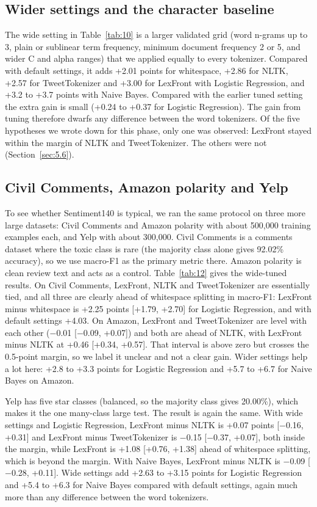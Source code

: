 \documentclass{ieeeaccess}
\begin{document}
\subsection{Wider settings and the character baseline}\label{sec:4.8}
The wide setting in Table~\ref{tab:10} is a larger validated grid (word n-grams up to 3, plain or sublinear term frequency, minimum document frequency 2 or 5, and wider C and alpha ranges) that we applied equally to every tokenizer. Compared with default settings, it adds +2.01 points for whitespace, +2.86 for NLTK, +2.57 for TweetTokenizer and +3.00 for LexFront with Logistic Regression, and +3.2 to +3.7 points with Naive Bayes. Compared with the earlier tuned setting the extra gain is small (+0.24 to +0.37 for Logistic Regression). The gain from tuning therefore dwarfs any difference between the word tokenizers. Of the five hypotheses we wrote down for this phase, only one was observed: LexFront stayed within the margin of NLTK and TweetTokenizer. The others were not (Section~\ref{sec:5.6}).

\subsection{Civil Comments, Amazon polarity and Yelp}\label{sec:4.9}
To see whether Sentiment140 is typical, we ran the same protocol on three more large datasets: Civil Comments and Amazon polarity with about 500,000 training examples each, and Yelp with about 300,000. Civil Comments is a comments dataset where the toxic class is rare (the majority class alone gives 92.02\% accuracy), so we use macro-F1 as the primary metric there. Amazon polarity is clean review text and acts as a control. Table~\ref{tab:12} gives the wide-tuned results. On Civil Comments, LexFront, NLTK and TweetTokenizer are essentially tied, and all three are clearly ahead of whitespace splitting in macro-F1: LexFront minus whitespace is +2.25 points [+1.79, +2.70] for Logistic Regression, and with default settings +4.03. On Amazon, LexFront and TweetTokenizer are level with each other ($-$0.01 [$-$0.09, +0.07]) and both are ahead of NLTK, with LexFront minus NLTK at +0.46 [+0.34, +0.57]. That interval is above zero but crosses the 0.5-point margin, so we label it unclear and not a clear gain. Wider settings help a lot here: +2.8 to +3.3 points for Logistic Regression and +5.7 to +6.7 for Naive Bayes on Amazon.

Yelp has five star classes (balanced, so the majority class gives 20.00\%), which makes it the one many-class large test. The result is again the same. With wide settings and Logistic Regression, LexFront minus NLTK is +0.07 points [$-$0.16, +0.31] and LexFront minus TweetTokenizer is $-$0.15 [$-$0.37, +0.07], both inside the margin, while LexFront is +1.08 [+0.76, +1.38] ahead of whitespace splitting, which is beyond the margin. With Naive Bayes, LexFront minus NLTK is $-$0.09 [$-$0.28, +0.11]. Wide settings add +2.63 to +3.15 points for Logistic Regression and +5.4 to +6.3 for Naive Bayes compared with default settings, again much more than any difference between the word tokenizers.
\end{document}
